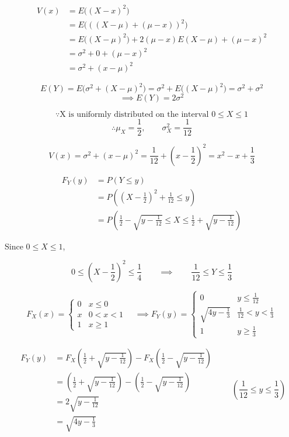 ﻿\documentclass[12pt]{article}
\begin{document}
\[
\begin{aligned}
V(x)&=E\big((X-x)^2\big)\\
&=E\big(((X-\mu)+(\mu-x))^2\big)\\
&=E\big((X-\mu)^2\big)+2(\mu-x)E(X-\mu)+(\mu-x)^2\\
&=\sigma^2+0+(\mu-x)^2\\
&=\sigma^2+(x-\mu)^2
\end{aligned}
\]
\bigskip

\[
E(Y)=E\big(\sigma^2+(X-\mu)^2\big)=\sigma^2+E\big((X-\mu)^2\big)=\sigma^2+\sigma^2
\]
\[
\implies \boxed{E(Y)=2\sigma^2}
\]

\bigskip
\[
\because \text{X is uniformly distributed on the interval } 0\leq X\leq 1
\]
\[
\therefore \mu_X=\frac12,\qquad \sigma_X^2=\frac1{12}
\]

\[V(x)=\sigma^2+(x-\mu)^2=\frac1{12}+\left(x-\frac12\right)^2=\boxed{x^2-x+\frac13}\]


\[
\begin{aligned}
F_Y(y)&=P(Y\leq y)\\
&=P\left(\left(X-\frac{1}{2}\right)^2+\frac{1}{12}\leq y\right)\\
&=P\left(\frac{1}{2}-\sqrt{y-\frac{1}{12}}\leq X\leq \frac{1}{2}+\sqrt{y-\frac{1}{12}}\right)
\end{aligned}
\]





Since $0\leq X\leq 1$,

\[
0\leq \left(X-\frac12\right)^2\leq \frac14\qquad\implies\qquad \frac1{12}\leq Y\leq \frac13
\]

\[
F_X(x)=
\begin{cases}
	0 & x\leq 0\\
	x & 0<x<1\\
	1 & x\geq 1
\end{cases}
\quad
\implies
F_Y(y)=
\begin{cases}
	0 & y\leq \frac{1}{12}\\
	\sqrt{4y-\frac{1}{3}} & \frac{1}{12}<y<\frac{1}{3}\\
	1 & y\geq \frac{1}{3}
\end{cases}
\]

\[
\begin{aligned}
F_Y(y)
&=F_X\left(\frac{1}{2}+\sqrt{y-\frac{1}{12}}\right)-F_X\left(\frac{1}{2}-\sqrt{y-\frac{1}{12}}\right)\\
&=\left(\frac{1}{2}+\sqrt{y-\frac{1}{12}}\right)-\left(\frac{1}{2}-\sqrt{y-\frac{1}{12}}\right)\\
&=2\sqrt{y-\frac{1}{12}}\\
&=\sqrt{4y-\frac{1}{3}}
\end{aligned}
\qquad \left(\frac{1}{12}\leq y\leq \frac{1}{3}\right)
\]
\end{document}

